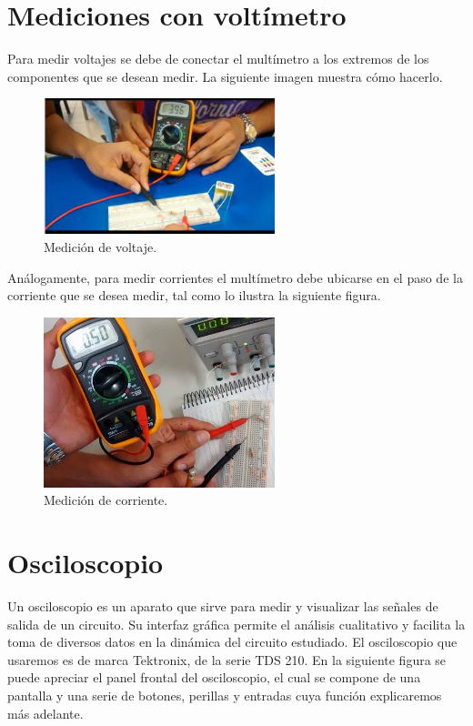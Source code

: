 \documentclass{scrartcl}
\begin{document}
\section{Mediciones con voltímetro}

Para medir voltajes se debe de conectar el multímetro a los extremos de los componentes que se desean medir. La siguiente imagen muestra cómo hacerlo.
\\ 

\begin{figure}[h!]
	\centering
	\includegraphics[width=0.6\textwidth,height=0.25\textheight]{voltaje}
	\caption{Medición de voltaje.}
\end{figure}

Análogamente, para medir corrientes el multímetro debe ubicarse en el paso de la corriente que se desea medir, tal como lo ilustra la siguiente figura.
\\ 

\begin{figure}[h!]
	\centering
	\includegraphics[width=0.6\textwidth,height=0.25\textheight]{corriente}
	\caption{Medición de corriente.}
\end{figure}

\section{Osciloscopio}
Un osciloscopio es un aparato que sirve para medir y visualizar las señales de salida de un circuito. Su interfaz gráfica permite el análisis cualitativo y facilita la toma de diversos datos en la dinámica del circuito estudiado. El osciloscopio que usaremos es de marca Tektronix, de la serie TDS 210. En la siguiente figura se puede apreciar el panel frontal del osciloscopio, el cual se compone de una pantalla y una serie de botones, perillas y entradas cuya función explicaremos más adelante.\\
\end{document}
